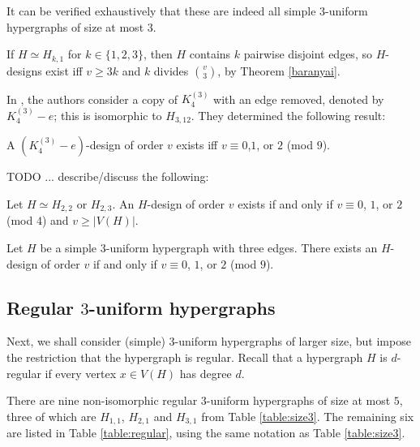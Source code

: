 It can be verified exhaustively that these are indeed all simple $3$-uniform hypergraphs of size at most 3.

If $H \simeq H_{k,1}$ for $k \in \{1, 2, 3\}$, then $H$ contains $k$ pairwise disjoint edges, so $H$-designs exist iff $v \geq 3k$ and $k$ divides ${v \choose 3}$, by Theorem \ref{baranyai}.


In \cite{feng-chang2}, the authors consider a copy of $K_4^{(3)}$ with an edge removed, denoted by $K_4^{(3)} - e$; this is isomorphic to $H_{3,12}$. They determined the following result:

\begin{theorem} \label{thm:H_3,12}
A $(K_4^{(3)}-e)$-design of order $v$ exists iff $v \equiv 0$,$1$, or $2$ (mod $9$).
\end{theorem}


\vspace{0.5cm}
TODO ... describe/discuss the following:
\vspace{0.5cm}


\begin{theorem} \label{thm:H_22,H_23}
Let $H \simeq H_{2,2}$ or $H_{2,3}$.
An $H$-design of order $v$ exists if and only if $v \equiv 0$, $1$, or $2$ (mod $4$) and $v \geq |V(H)|$.
\end{theorem}

\begin{theorem} \label{thm:H_3,i}
Let $H$ be a simple $3$-uniform hypergraph with three edges.
There exists an $H$-design of order $v$ if and only if $v \equiv 0$, $1$, or $2$ (mod $9$).
\end{theorem}

\subsection{Regular $3$-uniform hypergraphs}

Next, we shall consider (simple) $3$-uniform hypergraphs of larger size, but impose the restriction that the hypergraph is regular.
Recall that a hypergraph $H$ is $d$-regular if every vertex $x \in V(H)$ has degree $d$.

There are nine non-isomorphic regular $3$-uniform hypergraphs of size at most $5$, three of which are $H_{1,1}$, $H_{2,1}$ and $H_{3,1}$ from Table \ref{table:size3}.
The remaining six are listed in Table \ref{table:regular}, using the same notation as Table \ref{table:size3}.

